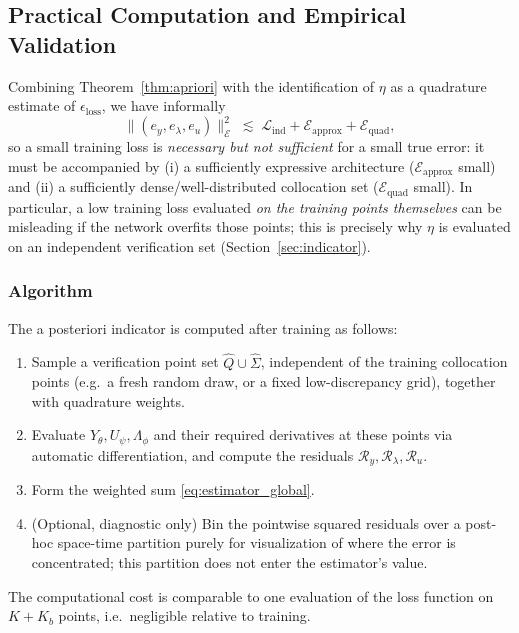 \subsection{Practical Computation and Empirical Validation}
\label{sec:practical}

Combining Theorem~\ref{thm:apriori} with the identification of $\eta$ as a quadrature estimate of $\epsilon_{\text{loss}}$, we have informally
\begin{equation}
\| (e_y, e_\lambda, e_u) \|_{\mathcal{E}}^2 \;\lesssim\; \mathcal{L}_{\text{ind}} + \mathcal{E}_{\text{approx}} + \mathcal{E}_{\text{quad}},
\end{equation}
so a small training loss is \emph{necessary but not sufficient} for a small true error: it must be accompanied by (i) a sufficiently expressive architecture ($\mathcal{E}_{\text{approx}}$ small) and (ii) a sufficiently dense/well-distributed collocation set ($\mathcal{E}_{\text{quad}}$ small). In particular, a low training loss evaluated \emph{on the training points themselves} can be misleading if the network overfits those points; this is precisely why $\eta$ is evaluated on an independent verification set (Section~\ref{sec:indicator}).

\subsubsection{Algorithm}

The a posteriori indicator is computed after training as follows:
\begin{enumerate}
    \item Sample a verification point set $\widehat{Q}\cup\widehat{\Sigma}$, independent of the training collocation points (e.g.\ a fresh random draw, or a fixed low-discrepancy grid), together with quadrature weights.
    \item Evaluate $Y_\theta, U_\psi, \Lambda_\phi$ and their required derivatives at these points via automatic differentiation, and compute the residuals $\mathcal{R}_y, \mathcal{R}_\lambda, \mathcal{R}_u$.
    \item Form the weighted sum \eqref{eq:estimator_global}.
    \item (Optional, diagnostic only) Bin the pointwise squared residuals over a post-hoc space-time partition purely for visualization of where the error is concentrated; this partition does not enter the estimator's value.
\end{enumerate}
The computational cost is comparable to one evaluation of the loss function on $K+K_b$ points, i.e.\ negligible relative to training.

